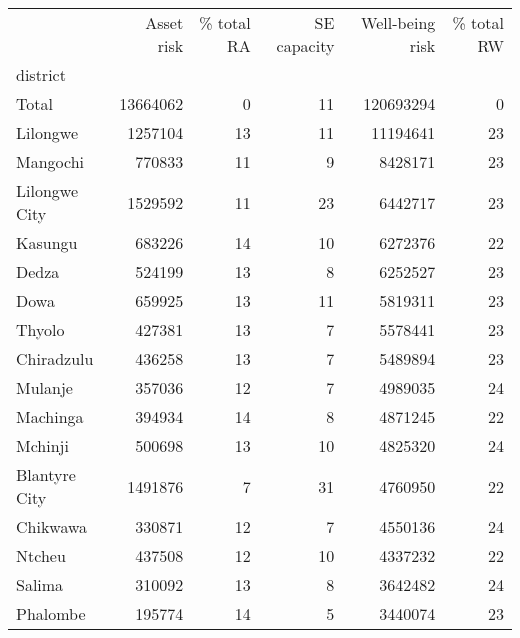 \begin{tabular}{lrrrrr}
\toprule
{} &  Asset risk &  \% total RA &  SE capacity &  Well-being risk &  \% total RW \\
district       &             &             &              &                  &             \\
\midrule
Total          &    13664062 &           0 &           11 &        120693294 &           0 \\
Lilongwe       &     1257104 &          13 &           11 &         11194641 &          23 \\
Mangochi       &      770833 &          11 &            9 &          8428171 &          23 \\
Lilongwe City  &     1529592 &          11 &           23 &          6442717 &          23 \\
Kasungu        &      683226 &          14 &           10 &          6272376 &          22 \\
Dedza          &      524199 &          13 &            8 &          6252527 &          23 \\
Dowa           &      659925 &          13 &           11 &          5819311 &          23 \\
Thyolo         &      427381 &          13 &            7 &          5578441 &          23 \\
Chiradzulu     &      436258 &          13 &            7 &          5489894 &          23 \\
Mulanje        &      357036 &          12 &            7 &          4989035 &          24 \\
Machinga       &      394934 &          14 &            8 &          4871245 &          22 \\
Mchinji        &      500698 &          13 &           10 &          4825320 &          24 \\
Blantyre City  &     1491876 &           7 &           31 &          4760950 &          22 \\
Chikwawa       &      330871 &          12 &            7 &          4550136 &          24 \\
Ntcheu         &      437508 &          12 &           10 &          4337232 &          22 \\
Salima         &      310092 &          13 &            8 &          3642482 &          24 \\
Phalombe       &      195774 &          14 &            5 &          3440074 &          23 \\

\end{tabular}
